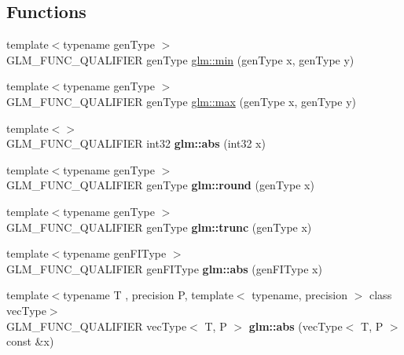 \subsection*{Functions}
\begin{DoxyCompactItemize}
\item 
{\footnotesize template$<$typename gen\+Type $>$ }\\G\+L\+M\+\_\+\+F\+U\+N\+C\+\_\+\+Q\+U\+A\+L\+I\+F\+I\+ER gen\+Type \hyperlink{group__core__func__common_ga2c2bde1cec025b7ddff83c74a1113719}{glm\+::min} (gen\+Type x, gen\+Type y)
\item 
{\footnotesize template$<$typename gen\+Type $>$ }\\G\+L\+M\+\_\+\+F\+U\+N\+C\+\_\+\+Q\+U\+A\+L\+I\+F\+I\+ER gen\+Type \hyperlink{group__core__func__common_ga98caa7f95a94c86a86ebce893a45326c}{glm\+::max} (gen\+Type x, gen\+Type y)
\item 
\mbox{\label{func__common_8inl_a297722642f818493a6e4b02f4cf7781b}} 
{\footnotesize template$<$$>$ }\\G\+L\+M\+\_\+\+F\+U\+N\+C\+\_\+\+Q\+U\+A\+L\+I\+F\+I\+ER int32 {\bfseries glm\+::abs} (int32 x)
\item 
\mbox{\label{func__common_8inl_a63066719f14195375ae55b9770460301}} 
{\footnotesize template$<$typename gen\+Type $>$ }\\G\+L\+M\+\_\+\+F\+U\+N\+C\+\_\+\+Q\+U\+A\+L\+I\+F\+I\+ER gen\+Type {\bfseries glm\+::round} (gen\+Type x)
\item 
\mbox{\label{func__common_8inl_a1bd4a73a4a1f73950597df2f67c01c43}} 
{\footnotesize template$<$typename gen\+Type $>$ }\\G\+L\+M\+\_\+\+F\+U\+N\+C\+\_\+\+Q\+U\+A\+L\+I\+F\+I\+ER gen\+Type {\bfseries glm\+::trunc} (gen\+Type x)
\item 
\mbox{\label{func__common_8inl_a20ebe8867152652a4830a35894b5ab33}} 
{\footnotesize template$<$typename gen\+F\+I\+Type $>$ }\\G\+L\+M\+\_\+\+F\+U\+N\+C\+\_\+\+Q\+U\+A\+L\+I\+F\+I\+ER gen\+F\+I\+Type {\bfseries glm\+::abs} (gen\+F\+I\+Type x)
\item 
{\footnotesize template$<$typename T , precision P, template$<$ typename, precision $>$ class vec\+Type$>$ }\\G\+L\+M\+\_\+\+F\+U\+N\+C\+\_\+\+Q\+U\+A\+L\+I\+F\+I\+ER vec\+Type$<$ T, P $>$ {\bfseries glm\+::abs} (vec\+Type$<$ T, P $>$ const \&x)

\end{DoxyCompactItemize}
